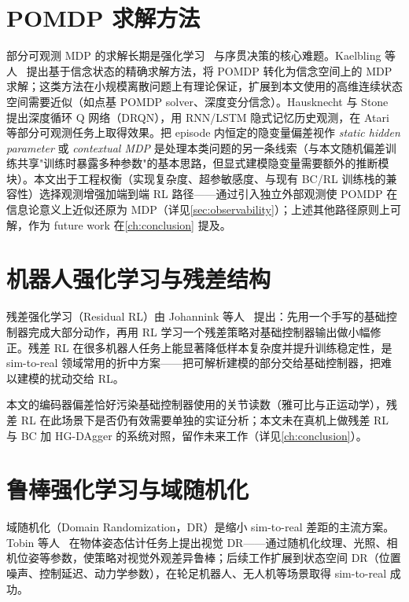 \section{POMDP 求解方法}\label{sec:pomdp_methods}

部分可观测 MDP 的求解长期是强化学习~\cite{sutton2018reinforcement} 与序贯决策的核心难题。Kaelbling 等人~\cite{kaelbling1998planning} 提出基于信念状态的精确求解方法，将 POMDP 转化为信念空间上的 MDP 求解；这类方法在小规模离散问题上有理论保证，扩展到本文使用的高维连续状态空间需要近似（如点基 POMDP solver、深度变分信念）。Hausknecht 与 Stone~\cite{hausknecht2015deep} 提出深度循环 Q 网络（DRQN），用 RNN/LSTM 隐式记忆历史观测，在 Atari 等部分可观测任务上取得效果。把 episode 内恒定的隐变量偏差视作 \emph{static hidden parameter} 或 \emph{contextual MDP} 是处理本类问题的另一条线索（与本文随机偏差训练共享"训练时暴露多种参数"的基本思路，但显式建模隐变量需要额外的推断模块）。本文出于工程权衡（实现复杂度、超参敏感度、与现有 BC/RL 训练栈的兼容性）选择观测增强加端到端 RL 路径——通过引入独立外部观测使 POMDP 在信息论意义上近似还原为 MDP（详见\cref{sec:observability}）；上述其他路径原则上可解，作为 future work 在\cref{ch:conclusion} 提及。

\section{机器人强化学习与残差结构}\label{sec:residual_rl}

残差强化学习（Residual RL）由 Johannink 等人~\cite{johannink2019residual} 提出：先用一个手写的基础控制器完成大部分动作，再用 RL 学习一个残差策略对基础控制器输出做小幅修正。残差 RL 在很多机器人任务上能显著降低样本复杂度并提升训练稳定性，是 sim-to-real 领域常用的折中方案——把可解析建模的部分交给基础控制器，把难以建模的扰动交给 RL。

本文的编码器偏差恰好污染基础控制器使用的关节读数（雅可比与正运动学），残差 RL 在此场景下是否仍有效需要单独的实证分析；本文未在真机上做残差 RL 与 BC 加 HG-DAgger 的系统对照，留作未来工作（详见\cref{ch:conclusion}）。

\section{鲁棒强化学习与域随机化}\label{sec:robust_rl_dr}

域随机化（Domain Randomization，DR）是缩小 sim-to-real 差距的主流方案。Tobin 等人~\cite{tobin2017domain} 在物体姿态估计任务上提出视觉 DR——通过随机化纹理、光照、相机位姿等参数，使策略对视觉外观差异鲁棒；后续工作扩展到状态空间 DR（位置噪声、控制延迟、动力学参数），在轮足机器人、无人机等场景取得 sim-to-real 成功。

